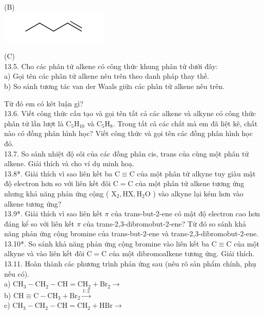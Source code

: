 \documentclass[10pt]{article}
\begin{document}
(B)\\
\includegraphics{smile-aeadeeea100e6f209653d5856dd5f15c0441d66b}

(C)\\
13.5. Cho các phân tử alkene có công thức khung phân tử dưới đây:\\
a) Gọi tên các phân tử alkene nêu trên theo danh pháp thay thế.\\
b) So sánh tương tác van der Waals giữa các phân tử alkene nêu trên.

Từ đó em có kêt luận gì?\\
13.6. Viết công thức cấu tạo và gọi tên tất cả các alkene và alkyne có công thức phân tử lần lượt là $\mathrm{C}_{5} \mathrm{H}_{10}$ và $\mathrm{C}_{5} \mathrm{H}_{8}$. Trong tất cả các chất mà em đã liệt kê, chất nào có đồng phân hình học? Viết công thức và gọi tên các đồng phân hình học đó.\\
13.7. So sánh nhiệt độ sôi của các đồng phân cis, trans của cùng một phân tử alkene. Giải thích và cho ví dụ minh hoạ.\\
13.8*. Giải thích vì sao liên kết ba $\mathrm{C} \equiv \mathrm{C}$ của một phân tử alkyne tuy giàu mật độ electron hơn so với liên kết đôi $\mathrm{C}=\mathrm{C}$ của một phân tử alkene tương ứng nhưng khả năng phản ứng cộng ( $\mathrm{X}_{2}, \mathrm{HX}, \mathrm{H}_{2} \mathrm{O}$ ) vào alkyne lại kém hơn vào alkene tương ứng?\\
13.9*. Giải thích vì sao liên kết $\pi$ của trans-but-2-ene có mật độ electron cao hơn đáng kể so với liên kết $\pi$ của trans-2,3-dibromobut-2-ene? Từ đó so sánh khả năng phản ứng cộng bromine của trans-but-2-ene và trans-2,3-dibromobut-2-ene.\\
13.10*. So sánh khả năng phản ứng cộng bromine vào liên kết ba $\mathrm{C} \equiv \mathrm{C}$ của một alkyne và vào liên kết đôi $\mathrm{C}=\mathrm{C}$ của một dibromoalkene tương ứng. Giải thích.\\
13.11. Hoàn thành các phương trình phản ứng sau (nêu rõ sản phẩm chính, phụ nếu có).\\
a) $\mathrm{CH}_{3}-\mathrm{CH}_{2}-\mathrm{CH}=\mathrm{CH}_{2}+\mathrm{Br}_{2} \longrightarrow$\\
b) $\mathrm{CH} \equiv \mathrm{C}-\mathrm{CH}_{3}+\mathrm{Br}_{2} \xrightarrow{1: 2}$\\
c) $\mathrm{CH}_{3}-\mathrm{CH}_{2}-\mathrm{CH}=\mathrm{CH}_{2}+\mathrm{HBr} \longrightarrow$\\
\end{document}
